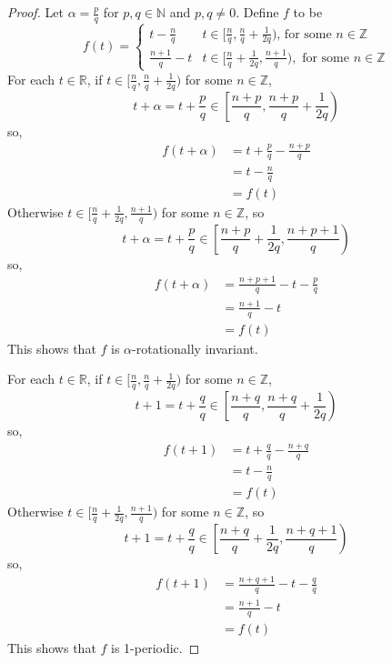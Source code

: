 \documentclass[12pt, reqno]{article}
\theoremstyle{definition}
\theoremstyle{remark}
\begin{document}
\begin{itemize}
\begin{proof}
    Let $\alpha= \frac{p}{q}$ for $p,q\in \mathbb{N}$ and $p,q\ne0$. Define $f$ to be 
    \[ 
        f(t)=\begin{cases} t- \frac{n}{q} & t\in[ \frac{n}{q}, \frac{n}{q}+ \frac{1}{2q})\text{, for some }n\in\mathbb{Z} \\ 
        \frac{n+1}{q}-t & t\in[\frac{n}{q}+ \frac{1}{2q},\frac{n+1}{q}),\text{ for some }n\in\mathbb{Z}\end{cases}
    \]
    For each $t\in\mathbb{R}$, if $t\in[ \frac{n}{q}, \frac{n}{q}+ \frac{1}{2q})$ for some $n\in\mathbb{Z}$, 
    \[ 
        t+\alpha=t+ \frac{p}{q}\in \left[ \frac{n+p}{q}, \frac{n+p}{q}+ \frac{1}{2q}\right)
    \] 
    so, 
    \begin{align*}
        f(t+\alpha)&= t+ \frac{p}{q}- \frac{n+p}{q}\\
        &= t- \frac{n}{q}\\
        &= f(t)
    \end{align*}
    Otherwise $t\in[ \frac{n}{q}+ \frac{1}{2q}, \frac{n+1}{q})$ for some $n\in\mathbb{Z}$, so
    \[ 
        t+\alpha=t+ \frac{p}{q}\in\left[ \frac{n+p}{q}+ \frac{1}{2q}, \frac{n+p+1}{q}\right)
    \] 
    so, 
    \begin{align*}
        f(t+\alpha)&= \frac{n+p+1}{q}-t-\frac{p}{q}\\
        &= \frac{n+1}{q}-t\\
        &= f(t)
    \end{align*}
    This shows that $f$ is $\alpha$-rotationally invariant. 

    For each $t\in\mathbb{R}$, if $t\in[ \frac{n}{q}, \frac{n}{q}+ \frac{1}{2q})$ for some $n\in\mathbb{Z}$, 
    \[ 
        t+1=t+ \frac{q}{q}\in \left[ \frac{n+q}{q}, \frac{n+q}{q}+ \frac{1}{2q}\right)
    \] 
    so, 
    \begin{align*}
        f(t+1)&= t+ \frac{q}{q}- \frac{n+q}{q}\\
        &= t- \frac{n}{q}\\
        &= f(t)
    \end{align*}
    Otherwise $t\in[ \frac{n}{q}+ \frac{1}{2q}, \frac{n+1}{q})$ for some $n\in\mathbb{Z}$, so
    \[ 
        t+1=t+ \frac{q}{q}\in\left[ \frac{n+q}{q}+ \frac{1}{2q}, \frac{n+q+1}{q}\right)
    \] 
    so, 
    \begin{align*}
        f(t+1)&= \frac{n+q+1}{q}-t-\frac{q}{q}\\
        &= \frac{n+1}{q}-t\\
        &= f(t)
    \end{align*}
    This shows that $f$ is 1-periodic.
    

\end{proof}
\end{itemize}
\end{document}

